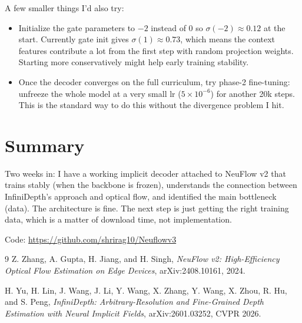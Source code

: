 \documentclass[11pt,a4paper]{article}
\begin{document}
A few smaller things I'd also try:
\begin{itemize}[leftmargin=*,itemsep=2pt]
  \item Initialize the gate parameters to $-2$ instead of $0$ so $\sigma(-2)\approx0.12$ at the start. Currently gate init gives $\sigma(1)\approx0.73$, which means the context features contribute a lot from the first step with random projection weights. Starting more conservatively might help early training stability.
  \item Once the decoder converges on the full curriculum, try phase-2 fine-tuning: unfreeze the whole model at a very small lr ($5\times10^{-6}$) for another 20k steps. This is the standard way to do this without the divergence problem I hit.
\end{itemize}

\section*{Summary}

Two weeks in: I have a working implicit decoder attached to NeuFlow v2 that trains stably (when the backbone is frozen), understands the connection between InfiniDepth's approach and optical flow, and identified the main bottleneck (data). The architecture is fine. The next step is just getting the right training data, which is a matter of download time, not implementation.

Code: \url{https://github.com/shrirag10/Neuflowv3}

\begin{thebibliography}{9}
Z. Zhang, A. Gupta, H. Jiang, and H. Singh, \emph{NeuFlow v2: High-Efficiency Optical Flow Estimation on Edge Devices}, arXiv:2408.10161, 2024.

H. Yu, H. Lin, J. Wang, J. Li, Y. Wang, X. Zhang, Y. Wang, X. Zhou, R. Hu, and S. Peng, \emph{InfiniDepth: Arbitrary-Resolution and Fine-Grained Depth Estimation with Neural Implicit Fields}, arXiv:2601.03252, CVPR 2026.
\end{thebibliography}
\end{document}
